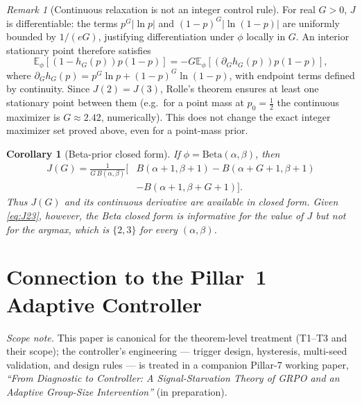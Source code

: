 \documentclass[11pt]{article}
\theoremstyle{plain}
\newtheorem{corollary}{Corollary}
\theoremstyle{definition}
\theoremstyle{remark}
\newtheorem{remark}{Remark}
\newcommand{\E}{\mathbb{E}}
\newcommand{\1}{\mathbb{1}}
\begin{document}
\begin{remark}[Continuous relaxation is not an integer control rule]
For real $G>0$, $J$ is differentiable: the terms $p^G|\ln p|$ and
$(1-p)^G|\ln(1-p)|$ are uniformly bounded by $1/(eG)$, justifying
differentiation under $\phi$ locally in $G$. An interior stationary point
therefore satisfies
\begin{equation}\label{eq:foc}
\E_\phi[(1-h_G(p))p(1-p)]
=-G\E_\phi[(\partial_G h_G(p))p(1-p)],
\end{equation}
where $\partial_G h_G(p)=p^G\ln p+(1-p)^G\ln(1-p)$, with endpoint
terms defined by continuity. Since $J(2)=J(3)$, Rolle's theorem ensures
at least one stationary point between them (e.g.\ for a point mass at
$p_0=\tfrac12$ the continuous maximizer is $G\approx2.42$, numerically).
This does not change the exact
integer maximizer set proved above, even for a point-mass prior.
\end{remark}

\begin{corollary}[Beta-prior closed form]\label{cor:beta}
If $\phi=\mathrm{Beta}(\alpha,\beta)$, then
\begin{align}
J(G)=\frac{1}{G\,B(\alpha,\beta)}\big[&B(\alpha+1,\beta+1)
-B(\alpha+G+1,\beta+1)\nonumber\\
&-B(\alpha+1,\beta+G+1)\big].
\end{align}
Thus $J(G)$ and its continuous derivative are available in closed form.
Given \eqref{eq:J23}, however, the Beta closed form is informative for the
\emph{value} of $J$ but not for the argmax, which is $\{2,3\}$ for every
$(\alpha,\beta)$.
\end{corollary}

\section{Connection to the Pillar~1 Adaptive Controller}\label{sec:controller}
\noindent\emph{Scope note.} This paper is
canonical for the theorem-level treatment (T1--T3 and their scope);
the controller's engineering --- trigger design, hysteresis, multi-seed
validation, and design rules --- is treated in a companion Pillar-7
working paper, \emph{``From Diagnostic to Controller: A Signal-Starvation
Theory of GRPO and an Adaptive Group-Size Intervention''} (in preparation).
\end{document}
